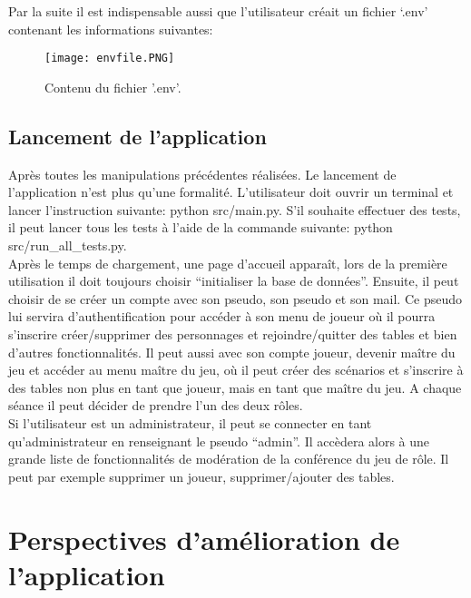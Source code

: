 \documentclass[11pt]{article}
\begin{document}
Par la suite il est indispensable aussi que l'utilisateur créait un fichier ‘.env’ contenant les informations suivantes: 

\begin{figure}[h]
\centering
\texttt{[image: envfile.PNG]}
\caption{
Contenu du fichier '.env'.}
\end{figure}

\newpage
\subsection{Lancement de l'application}

Après toutes les manipulations précédentes réalisées. Le lancement de l’application n’est plus qu’une formalité. L'utilisateur doit ouvrir un terminal et lancer l’instruction suivante: python src/main.py. S’il souhaite effectuer des tests, il peut lancer tous les tests à l'aide de la commande suivante:
python src/run\_all\_tests.py. \\

Après le temps de chargement, une page d’accueil apparaît, lors de la première utilisation il doit toujours choisir “initialiser la base de données”. Ensuite, il peut choisir de se créer un compte avec son pseudo, son pseudo et son mail. Ce pseudo lui servira d’authentification pour accéder à son menu de joueur où il pourra s’inscrire créer/supprimer des personnages et rejoindre/quitter des tables et bien d’autres fonctionnalités. Il peut aussi avec son compte joueur, devenir maître du jeu et accéder au menu maître du jeu, où il peut créer des scénarios et s’inscrire à des tables non plus en tant que joueur, mais en tant que maître du jeu. A chaque séance il peut décider de prendre l’un des deux rôles.\\

Si l'utilisateur est un administrateur, il peut se connecter en tant qu’administrateur en renseignant le pseudo “admin”. Il accèdera alors à une grande liste de fonctionnalités de modération de la conférence du jeu de rôle. Il peut par exemple supprimer un joueur, supprimer/ajouter des tables.






\newpage
\section{Perspectives d'amélioration de l'application}
\end{document}
